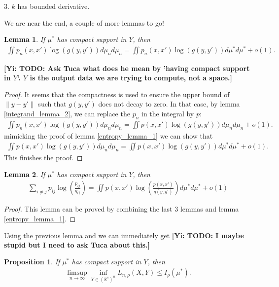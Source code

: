 \documentclass[10pt]{article}
\newcommand{\norm}[1]{\left\lVert#1\right\rVert}
\newcommand{\gy}[1]{\textbf{\color{red}[Yi: #1]}}
\newtheorem{lemma}{\bf Lemma}
\newtheorem{proposition}{\bf Proposition}
\newenvironment{Proof of lemma}{\noindent{\bf Proof of Lemma}}{\hfill$\Box$\newline}
\newenvironment{Proof of claim}{\noindent{\bf Proof of claim}}{\hfill$\Box$\newline}
\newenvironment{Proof of theorem}{\noindent{\bf Proof of Theorem}}{\hfill\scriptsize{$\Box$}\newline}
\newenvironment{Proof of theorems}{\noindent{\bf Proof of Theorems}}{\hfill$\Box$\newline}
\newenvironment{Proof of proposition}{\noindent{\bf Proof of Proposition}}{\hfill$\Box$\newline}
\newenvironment{Proof of propositions}{\noindent{\bf Proof of Propositions}}{\hfill$\Box$\newline}
\newenvironment{Proof of exercise}{\noindent{\it Proof of Exercise:}}{\hfill$\Box$}
\numberwithin{equation}{section}
\begin{document}
3. $k$ has bounded derivative.

We are near the end, a couple of more lemmas to go!
\begin{lemma}
    If $\mu^*$ has compact support in $Y$, then
    \begin{align}
        \iint p_n(x,x') \log(g(y,y')) d\mu_n d\mu_n = \iint p_n(x,x') \log(g(y,y')) d\mu^* d\mu^* +o(1).
    \end{align}
\end{lemma}
\gy{TODO: Ask Tuca what does he mean by 'having compact support in $Y$'. $Y$ is the output data we are trying to compute, not a space.}
\begin{proof}
    It seems that the compactness is used to ensure the upper bound of $\norm{y-y'}$ such that $g(y,y')$ does not decay to zero. In that case, by lemma \ref{integrand_lemma_2}, we can replace the $p_n$ in the integral by $p$:
    \begin{align}
        \iint p_n(x,x') \log(g(y,y')) d\mu_n d\mu_n = \iint p(x,x') \log(g(y,y')) d\mu_n d\mu_n + o(1).
    \end{align}
    mimicking the proof of lemma \ref{entropy_lemma_1} we can show that
    \begin{align}
        \iint p(x,x') \log(g(y,y')) d\mu_n d\mu_n = \iint p(x,x') \log(g(y,y')) d\mu^* d\mu^* + o(1).
    \end{align}
    This finishes the proof.
\end{proof}
\begin{lemma}
    If $\mu^*$ has compact support in $Y$, then
    \begin{align}
        \sum_{i \neq j} p_{ij} \log \left(\frac{p_{ij}}{q_{ij}}\right) = \iint p(x,x') \log\left(\frac{p(x,x')}{q(y,y')}\right) d\mu^* d\mu^* +o(1)
    \end{align}
\end{lemma}
\begin{proof}
    This lemma can be proved by combining the last 3 lemmas and lemma \ref{entropy_lemma_1}.
\end{proof}
Using the previous lemma and we can immediately get \gy{TODO: I maybe stupid but I need to ask Tuca about this.}
\begin{proposition} \label{upper_bound_prop}
    If $\mu^*$ has compact support in $Y$, then
    \begin{align}
        \limsup_{n \to \infty} \inf_{Y \in (\mathbb{R}^s)^n} L_{n,\rho}(X,Y) \leq I_{\rho}(\mu^*).
    \end{align}
\end{proposition}
\end{document}
